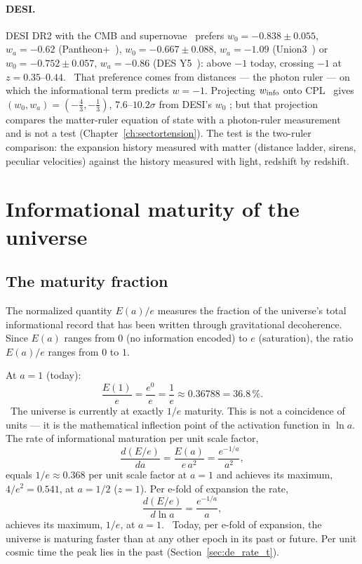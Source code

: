 \paragraph{DESI.} DESI DR2 with the CMB and supernovae~\cite{DESI2025} prefers $w_0=-0.838\pm0.055$, $w_a=-0.62$ (Pantheon+~\cite{Brout2022}), $w_0=-0.667\pm0.088$, $w_a=-1.09$
(Union3~\cite{Rubin2025}) or $w_0=-0.752\pm0.057$, $w_a=-0.86$ (DES Y5~\cite{DESY5SN2024}): above $-1$ today, crossing $-1$ at $z=0.35$--$0.44$. \observed\ That preference comes from distances ---
the photon ruler --- on which the informational term predicts $w=-1$. Projecting $w_{\rm info}$ onto CPL~\cite{ChevallierPolarski2001,Linder2003} gives $(w_0,w_a)=(-\tfrac43,-\tfrac13)$, $7.6$--$10.2\sigma$
from DESI's $w_0$ \calc; but that projection compares the matter-ruler equation of state with a photon-ruler measurement and is not a test (Chapter~\ref{ch:sectortension}).
The test is the two-ruler
comparison: the expansion history measured with matter (distance ladder, sirens, peculiar velocities) against the history measured with light,
redshift by redshift.

\section{Informational maturity of the universe}\label{sec:de_maturity}
\subsection{The maturity fraction}
The normalized quantity $E(a)/e$ measures the fraction of the universe's total informational record that has been written through gravitational
decoherence. Since $E(a)$ ranges from $0$ (no information encoded) to $e$ (saturation), the ratio $E(a)/e$ ranges from $0$ to $1$. \interp

At $a=1$ (today):
\begin{equation}\frac{E(1)}{e}=\frac{e^0}{e}=\frac1e\approx0.36788=36.8\,\%.\label{eq:de_maturity_today}\end{equation}
\derived\ The universe is currently at exactly $1/e$ maturity. This is not a coincidence of units --- it is the mathematical inflection point of
the activation function in $\ln a$. The rate of informational maturation per unit scale factor,
\begin{equation}\frac{d(E/e)}{da}=\frac{E(a)}{e\,a^2}=\frac{e^{-1/a}}{a^2},\label{eq:de_rate_a}\end{equation}
equals $1/e\approx0.368$ per unit scale factor at $a=1$ and achieves its maximum, $4/e^2=0.541$, at $a=1/2$ ($z=1$). Per e-fold of expansion the
rate,
\begin{equation}\frac{d(E/e)}{d\ln a}=\frac{e^{-1/a}}{a},\label{eq:de_rate_lna}\end{equation}
achieves its maximum, $1/e$, at $a=1$. \derived\ Today, per e-fold of expansion, the universe is maturing faster than at any other epoch in its past
or future. Per unit cosmic time the peak lies in the past (Section~\ref{sec:de_rate_t}).

